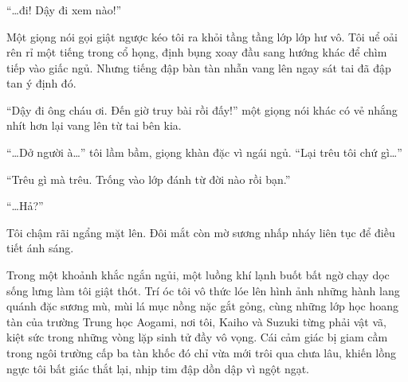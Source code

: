 \documentclass[../main.tex]{subfiles}
\begin{document}

\subsubsection*{\label{ep-C7.1}}



``\dots đi! Dậy đi xem nào!''

Một giọng nói gọi giật ngược kéo tôi ra khỏi tầng tầng lớp lớp hư vô. Tôi uể oải rên rỉ một tiếng trong cổ họng, định bụng xoay đầu sang hướng khác để chìm tiếp vào giấc ngủ. Nhưng tiếng đập bàn tàn nhẫn vang lên ngay sát tai đã đập tan ý định đó.

``Dậy đi ông cháu ơi. Đến giờ truy bài rồi đấy!'' một giọng nói khác có vẻ nhắng nhít hơn lại vang lên từ tai bên kia.

``\dots Dở người à\dots'' tôi lầm bầm, giọng khàn đặc vì ngái ngủ. ``Lại trêu tôi chứ gì\dots''

``Trêu gì mà trêu. Trống vào lớp đánh từ đời nào rồi bạn.''

``\dots Hả?''

Tôi chậm rãi ngẩng mặt lên. Đôi mắt còn mờ sương nhấp nháy liên tục để điều tiết ánh sáng.

Trong một khoảnh khắc ngắn ngủi, một luồng khí lạnh buốt bất ngờ chạy dọc sống lưng làm tôi giật thót. Trí óc tôi vô thức lóe lên hình ảnh những hành lang quánh đặc sương mù, mùi lá mục nồng nặc gắt gỏng, cùng những lớp học hoang tàn của trường Trung học Aogami, nơi tôi, Kaiho và Suzuki từng phải vật vã, kiệt sức trong những vòng lặp sinh tử đầy vô vọng. Cái cảm giác bị giam cầm trong ngôi trường cấp ba tàn khốc đó chỉ vừa mới trôi qua chưa lâu, khiến lồng ngực tôi bất giác thắt lại, nhịp tim đập dồn dập vì ngột ngạt.
\end{document}
